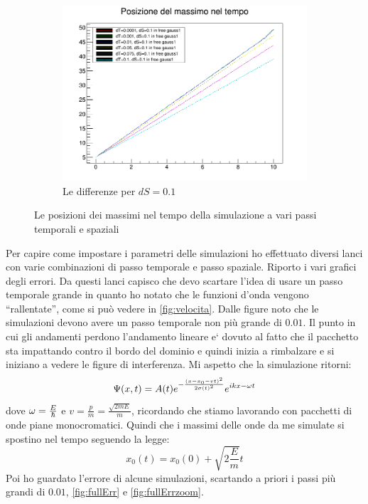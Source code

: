 \begin{figure}[hbt]
\begin{subfigure}[b]{0.3\textwidth}
		\includegraphics[width=\textwidth]{IMG/v_g1_01}
		\caption[Differenze in 0.1]{Le differenze per $dS = 0.1$}
	\end{subfigure}
	\caption{Le posizioni dei massimi nel tempo della simulazione a vari passi temporali  e spaziali}\label{fig:velocita}
\end{figure}

Per capire come impostare i parametri delle simulazioni ho effettuato diversi lanci con varie combinazioni di passo temporale e passo spaziale. Riporto i vari grafici degli errori.
Da questi lanci capisco che devo scartare l'idea di usare un passo temporale grande in quanto ho notato che le funzioni d'onda vengono ``rallentate'', come si pu\`o vedere in \autoref{fig:velocita}. Dalle figure noto che le simulazioni devono avere un passo temporale non pi\`u grande di $0.01$. Il punto in cui gli andamenti perdono l'andamento lineare e` dovuto al fatto che il pacchetto sta impattando contro il bordo del dominio e quindi inizia a rimbalzare e si iniziano a vedere le figure di interferenza.
Mi aspetto che la simulazione ritorni:
\begin{equation}
\Psi(x,t) = A(t)e^{-\frac{\left( x-x_0- v t \right)^2}{2\sigma(t)^2}}e^{ikx-\omega t}
\end{equation}
dove $\omega = \frac E\hbar$  e $v = \frac{p}{m} =\frac{\sqrt{2m E}}{m} $, ricordando che stiamo lavorando con pacchetti di onde piane monocromatici.
Quindi che i massimi delle onde da me simulate si spostino nel tempo seguendo la legge:
\begin{equation}
x_0(t) = x_0(0)+\sqrt{2\frac{E}{m}} t
\end{equation}
Poi ho guardato l'errore di alcune simulazioni, scartando a priori i passi pi\`u grandi di $0.01$, \autoref{fig:fullErr} e \ref{fig:fullErrzoom}.


